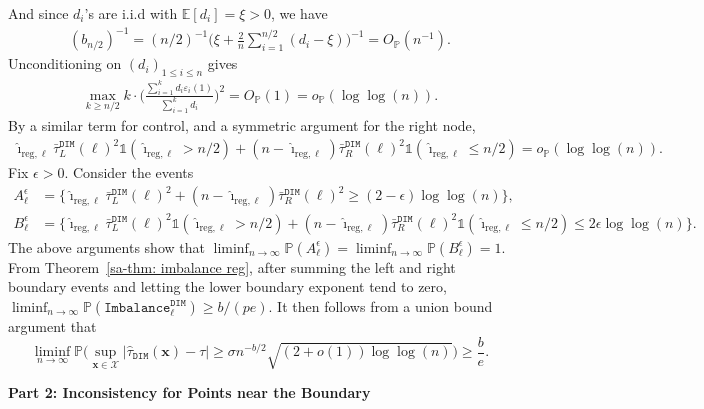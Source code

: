 \documentclass[10pt]{article}
\def\bx{\mathbf{x}}
\def\E{\mathbb{E}}
\def\P{\mathbb{P}}
\def\DIM{\mathtt{DIM}}
\def\reg{\text{reg}}
\newcommand{\Indicator}{\mathds{1}}
\theoremstyle{definition}
\theoremstyle{remark}
\begin{document}
And since $d_i$'s are i.i.d with $\E[d_i] = \xi > 0$, we have
\begin{align*}
    (b_{n/2})^{-1} = (n/2)^{-1} \Big(\xi + \frac{2}{n}\sum_{i = 1}^{n/2}(d_i - \xi)\Big)^{-1} = O_\P(n^{-1}).
\end{align*}
Unconditioning on $(d_i)_{1 \leq i \leq n}$ gives
\begin{align*}
    \max_{k \geq n/2} k \cdot \bigg(\frac{\sum_{i = 1}^k d_i \varepsilon_i(1)}{\sum_{i =1}^k d_i}\bigg)^2 = O_\P(1) = o_\P(\log \log (n)).
\end{align*}
By a similar term for control, and a symmetric argument for the right node, 
\begin{align*}
    \hat{\imath}_{\reg,\ell} \bar{\tau}_L^{\DIM}(\ell)^2 \Indicator(\hat{\imath}_{\reg,\ell} > n/2) + (n - \hat{\imath}_{\reg,\ell}) \bar{\tau}_R^{\DIM}(\ell)^2 \Indicator(\hat{\imath}_{\reg,\ell} \leq n/2) = o_\P(\log \log (n)).
\end{align*}
Fix $\epsilon > 0$. Consider the events
\begin{align*}
    A_{\ell}^{\epsilon} & = \bigg\{\hat{\imath}_{\reg,\ell} \bar{\tau}_L^{\DIM}(\ell)^2 + (n - \hat{\imath}_{\reg,\ell}) \bar{\tau}_R^{\DIM}(\ell)^2 \geq (2 - \epsilon) \log \log(n)\bigg\}, \\
    B_{\ell}^{\epsilon} & = \bigg\{\hat{\imath}_{\reg,\ell} \bar{\tau}_L^{\DIM}(\ell)^2 \Indicator(\hat{\imath}_{\reg,\ell} > n/2) + (n - \hat{\imath}_{\reg,\ell}) \bar{\tau}_R^{\DIM}(\ell)^2 \Indicator(\hat{\imath}_{\reg,\ell} \leq n/2)  \leq 2 \epsilon  \log \log (n)\bigg\}.
\end{align*}
The above arguments show that $\liminf_{n \rightarrow \infty} \P(A_{\ell}^{\epsilon}) = \liminf_{n \rightarrow \infty} \P(B_{\ell}^{\epsilon}) = 1$. From Theorem~\ref{sa-thm: imbalance reg}, after summing the left and right boundary events and letting the lower boundary exponent tend to zero, $\liminf_{n\to\infty}\P(\mathtt{Imbalance}_{\ell}^\DIM) \geq b/(pe)$. It then follows from a union bound argument that
\begin{equation*}
    \liminf_{n\to\infty} \mathbb{P}\bigg(\sup_{\bx\in\mathcal{X}}|\hat\tau_{\mathtt{DIM}}(\bx) - \tau| \geq \sigma n^{-b/2}\sqrt{(2+o(1))\log\log(n)}\bigg) \geq \frac{b}{e}.
\end{equation*}

\begin{center}
\textbf{Part 2: Inconsistency for Points near the Boundary}
\end{center}
\end{document}

